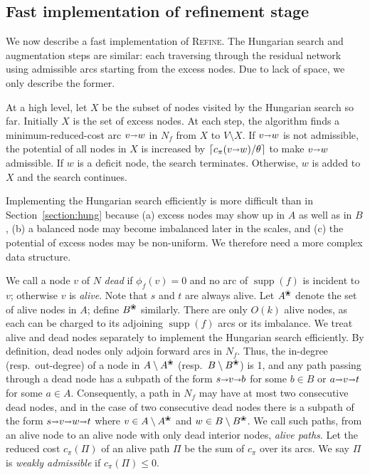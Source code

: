 \documentclass[11pt,twoside]{article}
\def\Ceil#1{\left\lceil #1 \right\rceil}
\def\fsupply{\phi}
\def\arcto{\mathord\shortrightarrow}
\def\arc#1#2{#1\arcto#2}
\def\supp{\operatorname{supp}}
\def\alive#1{{#1}^\text{\ding{96}}}
\def\dead#1{{#1} \setminus \alive{#1}}
\theoremstyle{plain}
\numberwithin{figure}{section}
\def\EMPH#1{\textcolor{BrickRed}{{\emph{#1}}}}
\begin{document}
\subsection{Fast implementation of refinement stage}
\label{SS:fast_refine}

We now describe a fast implementation of \textsc{Refine}.
The Hungarian search and augmentation steps are similar:
each traversing through the residual network using admissible arcs starting
from the excess nodes.
Due to lack of space, we only describe the former.

At a high level, let \EMPH{$X$} be the subset of nodes visited by the Hungarian search
so far.
Initially $X$ is the set of excess nodes.
At each step, the algorithm finds a minimum-reduced-cost arc $\arc vw$ in $N_f$
from $X$ to $V \setminus X$.
If $\arc vw$ is not admissible, the potential of all nodes in $X$ is increased
by $\Ceil{c_\pi(\arc vw)/\theta}$ to make $\arc vw$ admissible.
If $w $ is a deficit node, the search terminates.
Otherwise, $w$ is added to $X$ and the search continues.

Implementing the Hungarian search efficiently is more difficult than in
Section~\ref{section:hung} because (a) excess nodes may show up in $A$ as well as in $B$,
(b) a balanced node may become imbalanced later in the scales,
and (c) the potential of excess nodes may be non-uniform.
We therefore need a more complex data structure.

We call a node $v$ of $N$ \EMPH{dead} if $\fsupply_f(v) = 0$ and no arc of
$\supp(f)$ is incident to $v$; otherwise $v$ is \EMPH{alive}.
Note that $s$ and $t$ are always alive.
Let \EMPH{$\alive{A}$} denote the set of alive nodes in $A$; define \EMPH{$\alive{B}$} similarly.
There are only $O(k)$ alive nodes, as each can be charged to its
adjoining $\supp(f)$ arcs or its imbalance.
We treat alive and dead nodes separately to implement the Hungarian search
efficiently.
By definition, dead nodes only adjoin forward arcs in $N_f$.
Thus, the in-degree (resp.\ out-degree) of a node in $\dead{A}$ (resp.\ $\dead{B}$)
is 1, and any path passing through a dead node has a subpath of the form
$s \arcto v \arcto b$ for some $b \in B$ or $a \arcto v \arcto t$ for some $a \in A$.
Consequently, a path in $N_f$ may have at most two consecutive dead nodes,
and in the case of two consecutive dead nodes there is a subpath of the
form $s \arcto v \arcto w \arcto t$ where $v \in \dead{A}$ and $w \in \dead{B}$.
We call such paths, from an alive node to an alive node
with only dead interior nodes, \EMPH{alive paths}.
Let the reduced cost $c_\pi(\Pi)$ of an alive path $\Pi$ be the sum of $c_\pi$ over its arcs.
We say $\Pi$ is \EMPH{weakly admissible} if $c_\pi(\Pi) \leq 0$.
\end{document}
